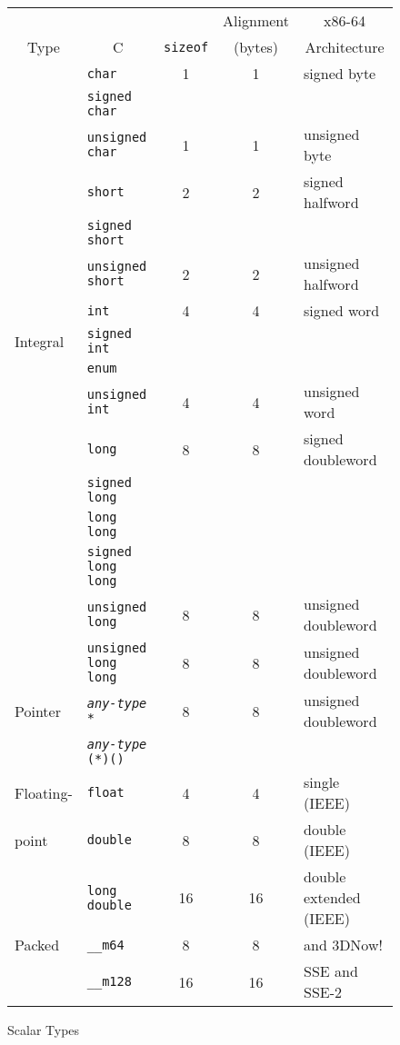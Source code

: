 \begin{figure}
  \caption{Scalar Types}\label{basic-types}
  \begin{tabular}{l|l|c|c|l}
    \hline\noalign{\smallskip}
     & &  & \multicolumn{1}{c|}{Alignment} & \multicolumn{1}{c|}{x86-64} \\
    \multicolumn{1}{c|}{Type} & \multicolumn{1}{c|}{C}
     &  \texttt{sizeof} & (bytes)   
     & \multicolumn{1}{c|}{Architecture}  \\
    \hline
    & \texttt{char}        & 1 & 1 & signed byte \\
    & \texttt{signed char} & & \\
    \cline{2-5}
    & \texttt{unsigned char} & 1 & 1 & unsigned byte \\
    \cline{2-5}
    & \texttt{short} & 2 & 2 & signed halfword \\
    & \texttt{signed short} & & \\
    \cline{2-5}
    & \texttt{unsigned short} & 2 & 2 & unsigned halfword \\
    \cline{2-5}
    & \texttt{int} & 4 & 4 & signed word \\
    Integral & \texttt{signed int} & & \\
    & \texttt{enum} & & \\
    \cline{2-5}
    & \texttt{unsigned int} & 4 & 4 & unsigned word \\
    \cline{2-5}
    & \texttt{long} & 8 & 8 & signed doubleword \\
    & \texttt{signed long} & & \\
    & \texttt{long long} & & \\
    & \texttt{signed long long} & & \\
    \cline{2-5}
    & \texttt{unsigned long} & 8 & 8 & unsigned doubleword \\
    & \texttt{unsigned long long} & 8 & 8 & unsigned doubleword \\
    \hline
    Pointer & \texttt{\textit{any-type} *} & 8 & 8 & unsigned doubleword \\
    & \texttt{\textit{any-type} (*)()} & & \\
    \hline
    Floating-& \texttt{float} & 4 & 4 & single (IEEE) \\
    point & \texttt{double} & 8 & 8 & double (IEEE) \\
    & \texttt{long double} & 16 & 16 & double extended (IEEE) \\
    \hline
    Packed & \texttt{__m64} & 8 & 8 & \MMX{} and 3DNow! \\
    & \texttt{__m128} & 16 & 16 & SSE and SSE-2 \\
  \end{tabular}
\end{figure}

